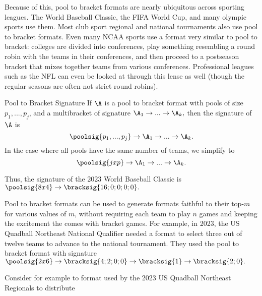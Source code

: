 {    Because of this, pool to bracket formats are nearly ubiquitous across sporting leagues. The World Baseball Classic, the FIFA World Cup, and many olympic sports use them. Most club sport regional and national tournaments also use pool to bracket formats. Even many NCAA sports use a format very similar to pool to bracket: colleges are divided into conferences, play something resembling a round robin with the teams in their conferences, and then proceed to a postseason bracket that mixes together teams from various conferences. Professional leagues such as the NFL can even be looked at through this lense as well (though the regular seasons are often not strict round robins).

    \begin{definition}{Pool to Bracket Signature}{}
        If $\A$ is a pool to bracket format with pools of size $p_1, ..., p_j$, and a multibracket of signature $\A_1 \to ... \to \A_k,$ then the signature of $\A$ is $$\poolsig{p_1, ..., p_j} \to \A_1 \to ... \to \A_k.$$ In the case where all pools have the same number of teams, we simplify to $$\poolsig{j x p} \to \A_1 \to ... \to \A_k.$$ 
    \end{definition}

    Thus, the signature of the 2023 World Baseball Classic is $\poolsig{8x4} \to \bracksig{16;0;0;0;0}.$

    Pool to bracket formats can be used to generate formats faithful to their top-$m$ for various values of $m$, without requiring each team to play $n$ games and keeping the excitement the comes with bracket games. For example, in 2023, the US Quadball Northeast National Qualifier needed a format to select three out of twelve teams to advance to the national tournament. They used the pool to bracket format with signature $\poolsig{2x6} \to \bracksig{4;2;0;0} \to \bracksig{1} \to \bracksig{2;0}.$
    
    
    Consider for example to format used by the 2023 US Quadball Northeast Regionals to distribute


}